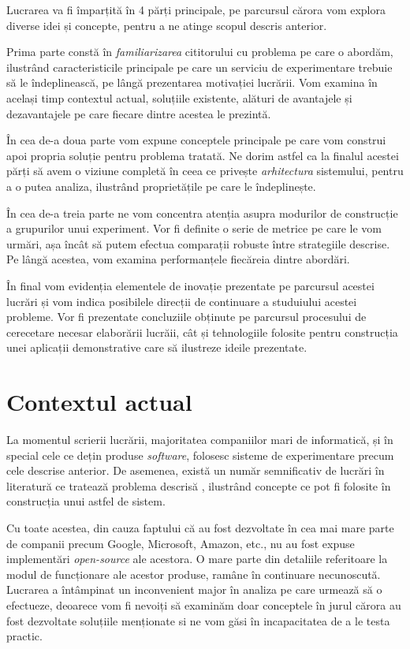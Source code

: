 Lucrarea va fi împarțită în 4 părți principale, pe parcursul cărora vom explora diverse idei și concepte, pentru a ne atinge scopul descris anterior. 

Prima parte constă în \textit{familiarizarea} cititorului cu problema pe care o abordăm, ilustrând caracteristicile principale pe care un serviciu de experimentare trebuie să le îndeplinească, pe lângă prezentarea motivației lucrării. Vom examina în același timp contextul actual, soluțiile existente, alături de avantajele și dezavantajele pe care fiecare dintre acestea le prezintă.

În cea de-a doua parte vom expune conceptele principale pe care vom construi apoi propria soluție pentru problema tratată. Ne dorim astfel ca la finalul acestei părți să avem o viziune completă în ceea ce privește \textit{arhitectura} sistemului, pentru a o putea analiza, ilustrând proprietățile pe care le îndeplinește.

În cea de-a treia parte ne vom concentra atenția asupra modurilor de construcție a grupurilor unui experiment. Vor fi definite o serie de metrice pe care le vom urmări, așa încât să putem efectua comparații robuste între strategiile descrise. Pe lângă acestea, vom examina performanțele fiecăreia dintre abordări.

În final vom evidenția elementele de inovație prezentate pe parcursul acestei lucrări și vom indica posibilele direcții de continuare a studuiului acestei probleme. Vor fi prezentate concluziile obținute pe parcursul procesului de cerecetare necesar elaborării lucrăii, cât și tehnologiile folosite pentru construcția unei aplicații demonstrative care să ilustreze ideile prezentate.

\section{Contextul actual}

La momentul scrierii lucrării, majoritatea companiilor mari de informatică, și în special cele ce dețin produse \textit{software}, folosesc sisteme de experimentare precum cele descrise anterior. De asemenea, există un număr semnificativ de lucrări în literatură ce tratează problema descrisă \cite{overlapgoogle} \cite{multiarmeconomy}, ilustrând concepte ce pot fi folosite în construcția unui astfel de sistem. 

Cu toate acestea, din cauza faptului că au fost dezvoltate în cea mai mare parte de companii precum Google, Microsoft, Amazon, etc., nu au fost expuse implementări \textit{open-source} ale acestora. O mare parte din detaliile referitoare la modul de funcționare ale acestor produse, ramâne în continuare necunoscută. Lucrarea a întâmpinat un inconvenient major în analiza pe care urmează să o efectueze, deoarece vom fi nevoiți să examinăm doar conceptele în jurul cărora au fost dezvoltate soluțiile menționate si ne vom găsi în incapacitatea de a le testa practic.


